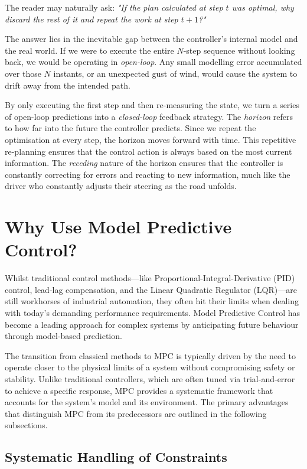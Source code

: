 The reader may naturally ask: \textit{"If the plan calculated at step $t$ was \emph{optimal}, why discard the rest of it and repeat the work at step $t+1$?"}

The answer lies in the inevitable gap between the controller's internal model and the real world. If we were to execute the entire $N$-step sequence without looking back, we would be operating in \emph{open-loop}. Any small modelling error accumulated over those $N$ instants, or an unexpected gust of wind, would cause the system to drift away from the intended path.

By only executing the first step and then re-measuring the state, we turn a series of open-loop predictions into a \emph{closed-loop} feedback strategy. The \emph{horizon} refers to how far into the future the controller predicts. Since we repeat the optimisation at every step, the horizon moves forward with time. This repetitive re-planning ensures that the control action is always based on the most current information. The \emph{receding} nature of the horizon ensures that the controller is constantly correcting for errors and reacting to new information, much like the driver who constantly adjusts their steering as the road unfolds. 

\section{Why Use Model Predictive Control?}

Whilst traditional control methods—like Proportional-Integral-Derivative (PID) control, lead-lag compensation, and the Linear Quadratic Regulator (LQR)—are still workhorses of industrial automation, they often hit their limits when dealing with today's demanding performance requirements. Model Predictive Control has become a leading approach for complex systems by anticipating future behaviour through model-based prediction.

The transition from classical methods to MPC is typically driven by the need to operate closer to the physical limits of a system without compromising safety or stability. Unlike traditional controllers, which are often tuned via trial-and-error to achieve a specific response, MPC provides a systematic framework that accounts for the system's model and its environment. The primary advantages that distinguish MPC from its predecessors are outlined in the following subsections.

\subsection{Systematic Handling of Constraints}

